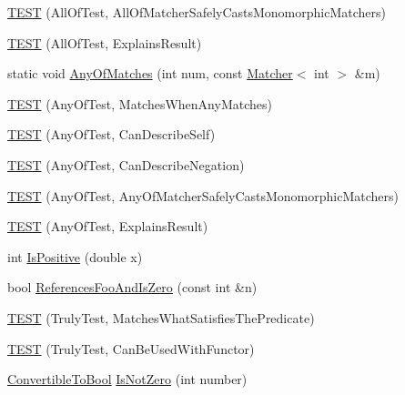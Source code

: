 \begin{DoxyCompactItemize}
\item 
\mbox{\hyperlink{namespacetesting_1_1gmock__matchers__test_a4196a4000390e2378954d55b4f6d2893}{T\+E\+ST}} (All\+Of\+Test, All\+Of\+Matcher\+Safely\+Casts\+Monomorphic\+Matchers)
\item 
\mbox{\hyperlink{namespacetesting_1_1gmock__matchers__test_a2b9f4a791dd4f1fb9f8a1400883a5db4}{T\+E\+ST}} (All\+Of\+Test, Explains\+Result)
\item 
static void \mbox{\hyperlink{namespacetesting_1_1gmock__matchers__test_a0765400728b9d42a07b720f3566f0b4c}{Any\+Of\+Matches}} (int num, const \mbox{\hyperlink{classtesting_1_1Matcher}{Matcher}}$<$ int $>$ \&m)
\item 
\mbox{\hyperlink{namespacetesting_1_1gmock__matchers__test_a4949d40a1ac77182274189c21848af00}{T\+E\+ST}} (Any\+Of\+Test, Matches\+When\+Any\+Matches)
\item 
\mbox{\hyperlink{namespacetesting_1_1gmock__matchers__test_a00bd490bf974b3f3485a1b0fde9fa490}{T\+E\+ST}} (Any\+Of\+Test, Can\+Describe\+Self)
\item 
\mbox{\hyperlink{namespacetesting_1_1gmock__matchers__test_acc5e849e0765f00a48581e9480f3c8e2}{T\+E\+ST}} (Any\+Of\+Test, Can\+Describe\+Negation)
\item 
\mbox{\hyperlink{namespacetesting_1_1gmock__matchers__test_a8fb1598253450afeb0440682cd23999e}{T\+E\+ST}} (Any\+Of\+Test, Any\+Of\+Matcher\+Safely\+Casts\+Monomorphic\+Matchers)
\item 
\mbox{\hyperlink{namespacetesting_1_1gmock__matchers__test_ad4c09014fce6029575e2c337cde85bdf}{T\+E\+ST}} (Any\+Of\+Test, Explains\+Result)
\item 
int \mbox{\hyperlink{namespacetesting_1_1gmock__matchers__test_a70e728cf67d0224c3ebb9eb8959cc39d}{Is\+Positive}} (double x)
\item 
bool \mbox{\hyperlink{namespacetesting_1_1gmock__matchers__test_abdce9daf2e3d3721d68f76680129f03b}{References\+Foo\+And\+Is\+Zero}} (const int \&n)
\item 
\mbox{\hyperlink{namespacetesting_1_1gmock__matchers__test_ab7761562a8ffea67a485f3f649f6430a}{T\+E\+ST}} (Truly\+Test, Matches\+What\+Satisfies\+The\+Predicate)
\item 
\mbox{\hyperlink{namespacetesting_1_1gmock__matchers__test_ab3e259f3ae45e199474d7c6d554852f0}{T\+E\+ST}} (Truly\+Test, Can\+Be\+Used\+With\+Functor)
\item 
\mbox{\hyperlink{classtesting_1_1gmock__matchers__test_1_1ConvertibleToBool}{Convertible\+To\+Bool}} \mbox{\hyperlink{namespacetesting_1_1gmock__matchers__test_a248045bc57c8bad87b7d185b5c292f60}{Is\+Not\+Zero}} (int number)

\end{DoxyCompactItemize}
